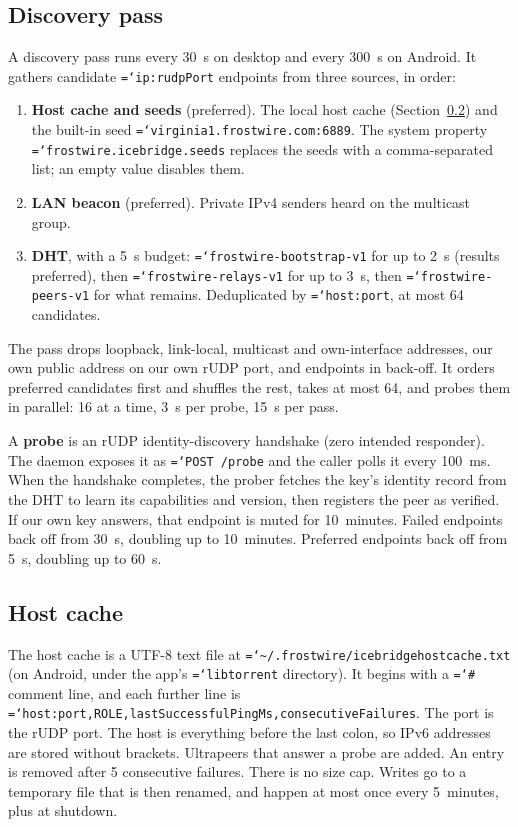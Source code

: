 \documentclass[11pt,a4paper]{article}
\newcommand{\code}[1]{\texttt{\hyphenchar\font=`\-\relax #1}}
\DeclareRobustCommand{\_}{\origunderscore\allowbreak}
\begin{document}
\subsection{Discovery pass}
A discovery pass runs every 30~s on desktop and every 300~s on Android. It gathers candidate
\code{ip:rudpPort} endpoints from three sources, in order:
\begin{enumerate}
\item \textbf{Host cache and seeds} (preferred). The local host cache
  (Section~\ref{sec:hostcache}) and the built-in seed \code{virginia1.frostwire.com:6889}.
  The system property \code{frostwire.icebridge.seeds} replaces the seeds with a
  comma-separated list; an empty value disables them.
\item \textbf{LAN beacon} (preferred). Private IPv4 senders heard on the multicast group.
\item \textbf{DHT}, with a 5~s budget: \code{frostwire-bootstrap-v1} for up to 2~s (results
  preferred), then \code{frostwire-relays-v1} for up to 3~s, then \code{frostwire-peers-v1}
  for what remains. Deduplicated by \code{host:port}, at most 64 candidates.
\end{enumerate}
The pass drops loopback, link-local, multicast and own-interface addresses, our own public
address on our own rUDP port, and endpoints in back-off. It orders preferred candidates
first and shuffles the rest, takes at most 64, and probes them in parallel: 16 at a time,
3~s per probe, 15~s per pass.

A \textbf{probe} is an rUDP identity-discovery handshake (zero intended responder). The daemon
exposes it as \code{POST /probe} and the caller polls it every 100~ms. When the handshake
completes, the prober fetches the key's identity record from the DHT to learn its
capabilities and version, then registers the peer as verified. If our own key answers, that
endpoint is muted for 10~minutes. Failed endpoints back off from 30~s, doubling up to
10~minutes. Preferred endpoints back off from 5~s, doubling up to 60~s.

\subsection{Host cache}
\label{sec:hostcache}
The host cache is a UTF-8 text file at \code{\~{}/.frostwire/icebridge\_host\_cache.txt}
(on Android, under the app's \code{libtorrent} directory). It begins with a \code{\#}
comment line, and each further line is
\code{host:port,ROLE,lastSuccessfulPingMs,consecutiveFailures}. The port is the rUDP
port. The host is everything before the last colon, so IPv6 addresses are stored without
brackets. Ultrapeers that answer a probe are added. An entry is removed after 5 consecutive
failures. There is no size cap. Writes go to a temporary file that is then renamed, and
happen at most once every 5~minutes, plus at shutdown.
\end{document}
